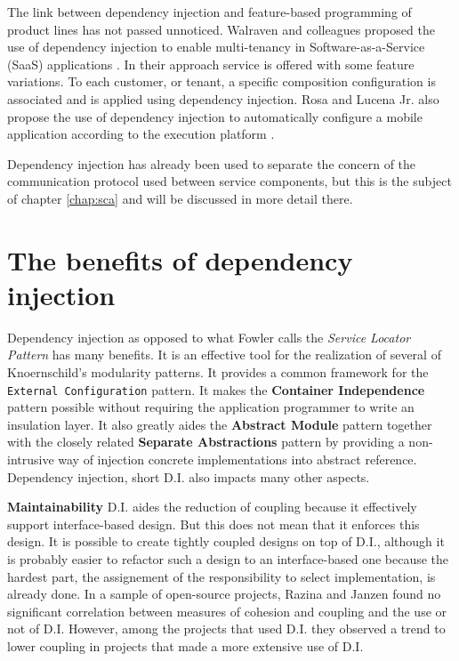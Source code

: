 The link between dependency injection and feature-based programming of product lines has not passed unnoticed.
Walraven and colleagues proposed the use of dependency injection to enable multi-tenancy in Software-as-a-Service
(SaaS) applications \cite{Walraven} \cite{Truyen}. In their approach service is offered with some feature variations.
To each customer, or tenant, a specific composition configuration is associated and is applied using dependency
injection. Rosa and Lucena Jr. also propose the use of dependency injection to automatically configure a mobile
application according to the execution platform \cite{Rosa}.

Dependency injection has already been used to separate the concern of the communication protocol used between
service components, but this is the subject of chapter \ref{chap:sca} and will be discussed in more detail there.

\section{The benefits of dependency injection}

Dependency injection as opposed to what Fowler calls the \emph{Service Locator Pattern} has many benefits.
It is an effective tool for the realization of several of Knoernschild's modularity patterns. It provides
a common framework for the \texttt{External Configuration} pattern. It makes the \textbf{Container Independence}
pattern possible without requiring the application programmer to write an insulation layer. It also greatly
aides the \textbf{Abstract Module} pattern together with the closely related \textbf{Separate Abstractions} pattern
by providing a non-intrusive way of injection concrete implementations into abstract reference.
Dependency injection, short D.I. also impacts many other aspects.

\textbf{Maintainability} D.I. aides the reduction of coupling because it effectively support interface-based
design. But this does not mean that it enforces this design. It is possible to create tightly coupled
designs on top of D.I., although it is probably easier to refactor such a design to an interface-based
one because the hardest part, the assignement of the responsibility to select implementation, is already
done. In a sample of open-source projects, Razina and Janzen found no significant correlation between
measures of cohesion and coupling and the use or not of D.I. However, among the projects that used D.I.
they observed a trend to lower coupling in projects that made a more extensive use of D.I. \cite{Razina}

